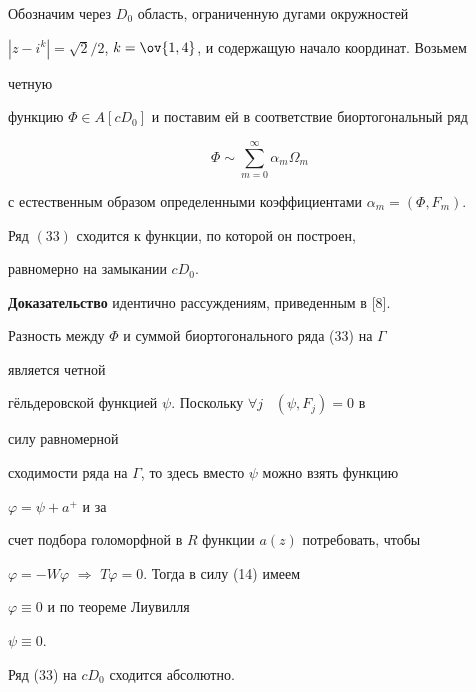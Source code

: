 Обозначим через $D_0$ область, ограниченную дугами окружностей 


$|z-i^k|=\sqrt{2}/2$, $k=\ov{1,4}$, и содержащую начало координат. Возьмем 


четную 


функцию $\Phi\in A[cD_0]$ и поставим ей в соответствие биортогональный ряд 


\begin{equation} 


\Phi\sim\sum^\infty_{m=0}\alpha_m\Omega_m 


\end{equation} 


с естественным образом определенными коэффициентами $\alpha_m=(\Phi,F_m)$. 


 


 


\begin{thm} 


Ряд $(33)$ сходится к функции, по которой он построен, 


равномерно на замыкании $cD_0$. 


\end{thm} 


 


 


{\bf Доказательство} идентично рассуждениям, приведенным в [8]. 


Разность между $\Phi$ и суммой биортогонального ряда (33) на $\Gamma$ 


является четной 


г\"ельдеровской функцией $\psi$. Поскольку $\forall j$ \ $(\psi,F_j)=0$ в 


силу равномерной 


сходимости ряда на $\Gamma$, то здесь вместо $\psi$ можно взять функцию 


$\varphi=\psi+a^+$ и за 


счет подбора голоморфной в $R$ функции $a(z)$ потребовать, чтобы 


$\varphi=-W\varphi$ $\Rightarrow$ $T\varphi=0$. Тогда в силу (14) имеем 


$\varphi\equiv0$ и по теореме Лиувилля 


$\psi\equiv0$. 


 


 


\begin{note} 


Ряд (33) на $cD_0$ сходится абсолютно. 


\end{note} 


